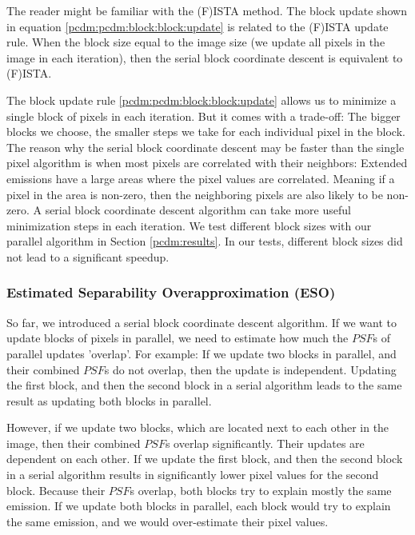 The reader might be familiar with the (F)ISTA method\cite{beck2009fista}. The block update shown in equation \eqref{pcdm:pcdm:block:block:update} is related to the (F)ISTA update rule. When the block size equal to the image size (we update all pixels in the image in each iteration), then the serial block coordinate descent is equivalent to (F)ISTA.

The block update rule \eqref{pcdm:pcdm:block:block:update} allows us to minimize a single block of pixels in each iteration. But it comes with a trade-off: The bigger blocks we choose, the smaller steps we take for each individual pixel in the block. The reason why the serial block coordinate descent may be faster than the single pixel algorithm is when most pixels are correlated with their neighbors: Extended emissions have a large areas where the pixel values are correlated. Meaning if a pixel in the area is non-zero, then the neighboring pixels are also likely to be non-zero. A serial block coordinate descent algorithm can take more useful minimization steps in each iteration. We test different block sizes with our parallel algorithm in Section \ref{pcdm:results}. In our tests, different block sizes did not lead to a significant speedup.


\subsubsection{Estimated Separability Overapproximation (ESO)} \label{pcdm:pcdm:eso}
So far, we introduced a serial block coordinate descent algorithm. If we want to update blocks of pixels in parallel, we need to estimate how much the $PSF$s of parallel updates 'overlap'. For example: If we update two blocks in parallel, and their combined $PSF$s do not overlap, then the update is independent. Updating the first block, and then the second block in a serial algorithm leads to the same result as updating both blocks in parallel. 

However, if we update two blocks, which are located next to each other in the image, then their combined $PSF$s overlap significantly. Their updates are dependent on each other. If we update the first block, and then the second block in a serial algorithm results in significantly lower pixel values for the second block. Because their $PSF$s overlap, both blocks try to explain mostly the same emission. If we update both blocks in parallel, each block would try to explain the same emission, and we would over-estimate their pixel values.


